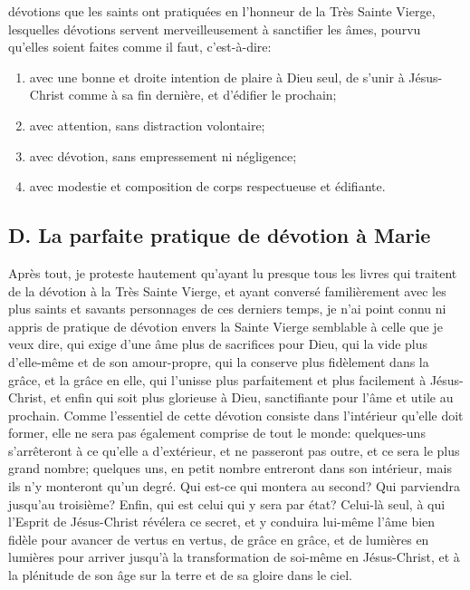 dévotions que les saints ont pratiquées en l'honneur de la Très Sainte Vierge, lesquelles dévotions servent
merveilleusement à sanctifier les âmes, pourvu qu'elles soient faites comme il faut, c'est-à-dire:
\begin{enumerate}[label=\arabic*°]
  \item avec une bonne et droite intention de plaire à Dieu seul, de s'unir à Jésus-Christ comme à sa fin dernière, et d'édifier le prochain;
  \item avec attention, sans distraction volontaire;
  \item avec dévotion, sans empressement ni négligence;
  \item avec modestie et composition de corps respectueuse et édifiante.
\end{enumerate}

\subsection{D. La parfaite pratique de dévotion à Marie}
 Après tout, je proteste hautement qu'ayant lu presque tous les livres qui traitent de la dévotion à la Très
Sainte Vierge, et ayant conversé familièrement avec les plus saints et savants personnages de ces derniers
temps, je n'ai point connu ni appris de pratique de dévotion envers la Sainte Vierge semblable à celle que je veux
dire, qui exige d'une âme plus de sacrifices pour Dieu, qui la vide plus d'elle-même et de son amour-propre, qui la
conserve plus fidèlement dans la grâce, et la grâce en elle, qui l'unisse plus parfaitement et plus facilement à
Jésus-Christ, et enfin qui soit plus glorieuse à Dieu, sanctifiante pour l'âme et utile au prochain.
 Comme l'essentiel de cette dévotion consiste dans l'intérieur qu'elle doit former, elle ne sera pas également
comprise de tout le monde: quelques-uns s'arrêteront à ce qu'elle a d'extérieur, et ne passeront pas outre, et ce
sera le plus grand nombre; quelques uns, en petit nombre entreront dans son intérieur, mais ils n'y monteront
qu'un degré. Qui est-ce qui montera au second? Qui parviendra jusqu'au troisième? Enfin, qui est celui qui y sera
par état? Celui-là seul, à qui l'Esprit de Jésus-Christ révélera ce secret, et y conduira lui-même l'âme bien fidèle
pour avancer de vertus en vertus, de grâce en grâce, et de lumières en lumières pour arriver jusqu'à la
transformation de soi-même en Jésus-Christ, et à la plénitude de son âge sur la terre et de sa gloire dans le ciel.

